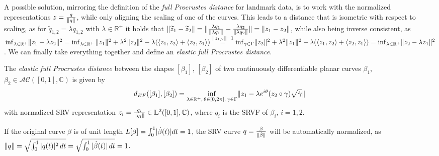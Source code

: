 A possible solution, mirroring the definition of the \emph{full Procrustes distance} for landmark data, is to work with the normalized representations $z = \frac{q}{\lVert q\rVert}$, while only aligning the scaling of one of the curves.
This leads to a distance that is isometric with respect to scaling, as for $\widetilde{q}_{1,2} = \lambda q_{1,2}$ with $\lambda \in \mathbb{R}^+$ it holds that $\lVert\widetilde z_1 - \widetilde z_2\rVert = \lVert \frac{\lambda q_1}{\lVert\lambda q_1\rVert} - \frac{\lambda q_2}{\lVert\lambda q_2\rVert}\rVert = \lVert z_1 - z_2\rVert$, while also being inverse consistent, as $\inf_{\lambda \in \mathbb{R}^+} \lVert z_1 - \lambda z_2\rVert^2 = \inf_{\lambda \in \mathbb{R}^+}\,\lVert z_1\rVert^2 + \lambda^2 \lVert z_2\rVert^2 - \lambda (\langle z_1, z_2 \rangle + \langle z_2, z_1 \rangle) \overset{\lVert z_{1,2}\rVert = 1}{=} \inf_{\gamma \in \Gamma} \lVert z_2\rVert^2 + \lambda^2 \lVert z_1\rVert^2 - \lambda (\langle z_1, z_2 \rangle + \langle z_2, z_1 \rangle) = \inf_{\lambda \in \mathbb{R}^+} \lVert z_2 - \lambda z_1\rVert^2$.
We can finally take everything together and define an \emph{elastic full Procrustes distance}.
\begin{definition}
  \label{def:dist}
  The \emph{elastic full Procrustes distance} between the shapes $[\beta_1]$, $[\beta_2]$ of two continuously differentiable planar curves $\beta_1$, $\beta_2 \in \mathcal{AC}([0,1],\mathbb{C})$  is given by 
    $$d_{EF}([\beta_1], [\beta_2]) = \inf_{\lambda \in \mathbb{R}^+,\, \theta \in
    [0,2\pi],\, \gamma \in \Gamma} \lVert z_1 - \lambda e^{i\theta} (z_2 \circ \gamma) \sqrt{\dot\gamma}\rVert\, $$
    with normalized SRV representation $z_{i} = \frac{q_{i}}{\lVert q_{i}\rVert} \in \mathbb{L}^2([0,1], \mathbb{C})$, where $q_i$ is the SRVF of $\beta_i$, $i = 1,2$.
\end{definition}
\begin{remark}
  If the original curve $\beta$ is of unit length $L[\beta] = \int_0^1 \lvert\dot\beta(t)\rvert dt = 1$, the SRV curve $q = \frac{\dot\beta}{\lVert\dot\beta\rVert}$ will be automatically normalized, as $ \lVert q\rVert = \sqrt{ \int_0^1 |q(t)|^2 \, dt} = \sqrt{\int_0^1 |\dot{\beta}(t)| \, dt} = 1$.
\end{remark}

